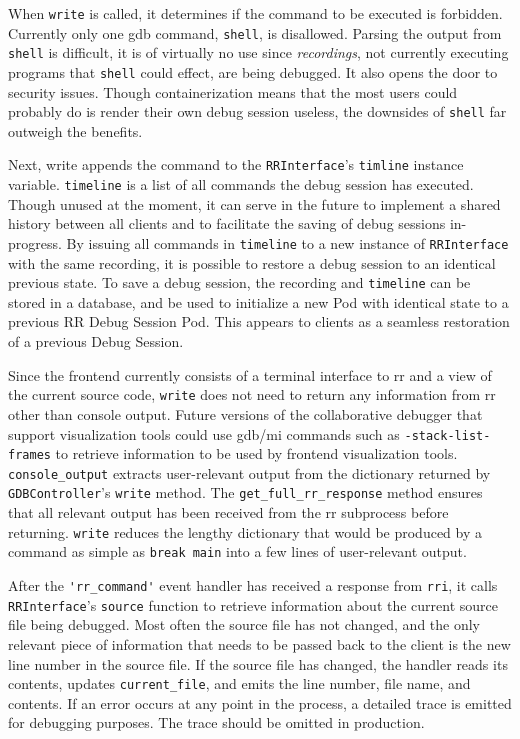 \documentclass[12pt]{article}
\begin{document}
When \lstinline{write} is called, it determines if the command to be
executed is forbidden.  Currently only one gdb command,
\lstinline{shell}, is disallowed.  Parsing the output from
\lstinline{shell} is difficult, it is of virtually no use since
\textit{recordings}, not currently executing programs that
\lstinline{shell} could effect, are being debugged.  It also opens the
door to security issues.  Though containerization means that the most
users could probably do is render their own debug session useless, the
downsides of \lstinline{shell} far outweigh the benefits.
\par

Next, write appends the command to the \lstinline{RRInterface}'s
\lstinline{timline} instance variable.  \lstinline{timeline} is a list
of all commands the debug session has executed.  Though unused at the
moment, it can serve in the future to implement a shared history
between all clients and to facilitate the saving of debug sessions
in-progress.  By issuing all commands in \lstinline{timeline} to a new
instance of \lstinline{RRInterface} with the same recording, it is
possible to restore a debug session to an identical previous state.
To save a debug session, the recording and \lstinline{timeline} can be
stored in a database, and be used to initialize a new Pod with
identical state to a previous RR Debug Session Pod.  This appears to
clients as a seamless restoration of a previous Debug Session.
\par

Since the frontend currently consists of a terminal interface to rr
and a view of the current source code, \lstinline{write} does not need
to return any information from rr other than console output.  Future
versions of the collaborative debugger that support visualization
tools could use gdb/mi commands such as \lstinline{-stack-list-frames}
to retrieve information to be used by frontend visualization tools.
\lstinline{console_output} extracts user-relevant output from the
dictionary returned by \lstinline{GDBController}'s \lstinline{write}
method.  The \lstinline{get_full_rr_response} method ensures that all
relevant output has been received from the rr subprocess before
returning.  \lstinline{write} reduces the lengthy dictionary that
would be produced by a command as simple as \lstinline{break main}
into a few lines of user-relevant output.
\par

After the \lstinline{'rr_command'} event handler has received a
response from \lstinline{rri}, it calls \lstinline{RRInterface}'s
\lstinline{source} function to retrieve information about the current
source file being debugged.  Most often the source file has not
changed, and the only relevant piece of information that needs to be
passed back to the client is the new line number in the source file.
If the source file has changed, the handler reads its contents,
updates \lstinline{current_file}, and emits the line number, file
name, and contents.  If an error occurs at any point in the process, a
detailed trace is emitted for debugging purposes.  The trace should
be omitted in production.
\par
\end{document}
